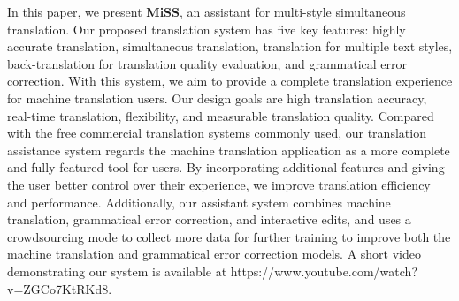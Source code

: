 In this paper, we present \textbf{MiSS}, an assistant for multi-style simultaneous translation. Our proposed translation system has five key features: highly accurate translation, simultaneous translation, translation for multiple text styles, back-translation for translation quality evaluation, and grammatical error correction. With this system, we aim to provide a complete translation experience for machine translation users. Our design goals are high translation accuracy, real-time translation, flexibility, and measurable translation quality. Compared with the free commercial translation systems commonly used, our translation assistance system regards the machine translation application as a more complete and fully-featured tool for users. By incorporating additional features and giving the user better control over their experience, we improve translation efficiency and performance. Additionally, our assistant system combines machine translation, grammatical error correction, and interactive edits, and uses a crowdsourcing mode to collect more data for further training to improve both the machine translation and grammatical error correction models. A short video demonstrating our system is available at https://www.youtube.com/watch?v=ZGCo7KtRKd8.